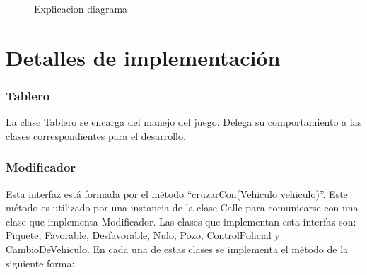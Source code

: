 \documentclass[titlepage,a4paper]{article}
\begin{document}
\begin{figure}[H]
\centering
\caption{\label{fig:class01}Explicacion diagrama}
\end{figure}

\section{Detalles de implementación}\label{sec:implementacion}

\subsubsection[Tablero]{Tablero}

La clase Tablero se encarga del manejo del juego. Delega su comportamiento a las clases correspondientes para el desarrollo.

\subsubsection[Modificador]{Modificador}

Esta interfaz está formada por el método “cruzarCon(Vehiculo vehiculo)”. Este método es utilizado por una instancia de la clase Calle para comunicarse con una clase que implementa Modificador. 
Las clases que implementan esta interfaz son: Piquete, Favorable, Desfavorable, Nulo, Pozo, ControlPolicial y CambioDeVehiculo. En cada una de estas clases se implementa el método de la siguiente forma:
\end{document}
